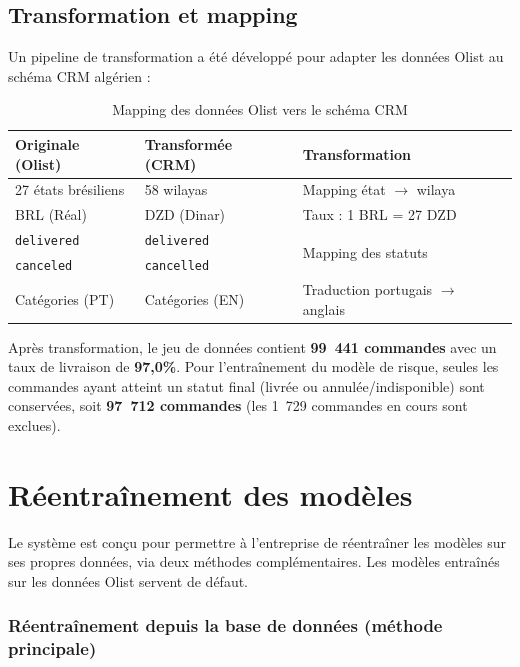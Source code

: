 \documentclass[12pt,a4paper]{report}
\begin{document}
\subsection{Transformation et mapping}

Un pipeline de transformation a \'{e}t\'{e} d\'{e}velopp\'{e} pour adapter les donn\'{e}es Olist au sch\'{e}ma CRM alg\'{e}rien :

\begin{table}[H]
\centering
\caption{Mapping des donn\'{e}es Olist vers le sch\'{e}ma CRM}
\label{tab:mapping}
\begin{tabularx}{\textwidth}{l l X}
\toprule
\textbf{Originale (Olist)} & \textbf{Transform\'{e}e (CRM)} & \textbf{Transformation} \\
\midrule
27 \'{e}tats br\'{e}siliens & 58 wilayas & Mapping \'{e}tat $\rightarrow$ wilaya \\
BRL (R\'{e}al) & DZD (Dinar) & Taux : 1 BRL = 27 DZD \\
\texttt{delivered} & \texttt{delivered} & \multirow{2}{*}{Mapping des statuts} \\
\texttt{canceled} & \texttt{cancelled} & \\
Cat\'{e}gories (PT) & Cat\'{e}gories (EN) & Traduction portugais $\rightarrow$ anglais \\
\bottomrule
\end{tabularx}
\end{table}

Apr\`{e}s transformation, le jeu de donn\'{e}es contient \textbf{99~441 commandes} avec un taux de livraison de \textbf{97,0\%}. Pour l'entra\^{i}nement du mod\`{e}le de risque, seules les commandes ayant atteint un statut final (livr\'{e}e ou annul\'{e}e/indisponible) sont conserv\'{e}es, soit \textbf{97~712 commandes} (les 1~729 commandes en cours sont exclues).

\section{R\'{e}entra\^{i}nement des mod\`{e}les}

Le syst\`{e}me est con\c{c}u pour permettre \`{a} l'entreprise de r\'{e}entra\^{i}ner les mod\`{e}les sur ses propres donn\'{e}es, via deux m\'{e}thodes compl\'{e}mentaires. Les mod\`{e}les entra\^{i}n\'{e}s sur les donn\'{e}es Olist servent de d\'{e}faut.

\subsubsection{R\'{e}entra\^{i}nement depuis la base de donn\'{e}es (m\'{e}thode principale)}
\end{document}
